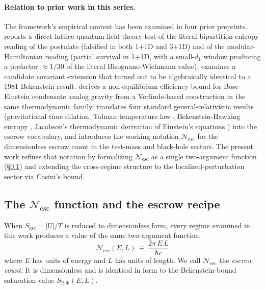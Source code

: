 \documentclass[11pt]{article}
\begin{document}
\paragraph{Relation to prior work in this series.} The framework's empirical content has been examined in four prior preprints. \cite{Whitmer2026Lattice} reports a direct lattice quantum field theory test of the literal bipartition-entropy reading of the postulate (falsified in both 1+1D and 3+1D) and of the modular-Hamiltonian reading (partial survival in 1+1D, with a small-$d_1$ window producing a prefactor $\approx 1/30$ of the literal Bisognano-Wichmann value). \cite{Whitmer2026C8} examines a candidate covariant extension that turned out to be algebraically identical to a 1981 Bekenstein result. \cite{Whitmer2026Phonon} derives a non-equilibrium efficiency bound for Bose-Einstein condensate analog gravity from a Verlinde-based construction in the same thermodynamic family. \cite{Whitmer2026Translation} translates four standard general-relativistic results (gravitational time dilation, Tolman temperature law \cite{Tolman1930}, Bekenstein-Hawking entropy \cite{Hawking1975}, Jacobson's thermodynamic derivation of Einstein's equations \cite{Jacobson1995}) into the escrow vocabulary, and introduces the working notation $\mathcal{N}_{\mathrm{esc}}$ for the dimensionless escrow count in the test-mass and black-hole sectors. The present work refines that notation by formalizing $\mathcal{N}_{\mathrm{esc}}$ as a single two-argument function (\S\ref{sec:Nesc_family}) and extending the cross-regime structure to the localized-perturbation sector via Casini's bound.

\subsection{The $\mathcal{N}_{\mathrm{esc}}$ function and the escrow recipe}
\label{sec:Nesc_family}

When $S_{\mathrm{esc}} = |U|/T$ is reduced to dimensionless form, every regime examined in this work produces a value of the same two-argument function:
\begin{equation}
\boxed{\quad\mathcal{N}_{\mathrm{esc}}(E, L) \,\equiv\, \frac{2\pi \, E \, L}{\hbar c}\quad}
\label{eq:Nesc_definition}
\end{equation}
where $E$ has units of energy and $L$ has units of length. We call $\mathcal{N}_{\mathrm{esc}}$ the \emph{escrow count}. It is dimensionless and is identical in form to the Bekenstein-bound saturation value $S_{\mathrm{Bek}}(E, L)$.
\end{document}
